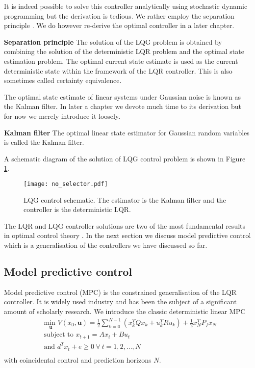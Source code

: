 It is indeed possible to solve this controller analytically using stochastic dynamic programming but the derivation is tedious. We rather employ the separation principle \cite{lqg}. We do however re-derive the optimal controller in a later chapter.
\begin{defn}
\textbf{Separation principle} The solution of the LQG problem is obtained by combining the solution of the deterministic LQR problem and the optimal state estimation problem. The optimal current state estimate is used as the current deterministic state within the framework of the LQR controller. This is also sometimes called certainty equivalence. 
\end{defn}
The optimal state estimate of linear systems under Gaussian noise is known as the Kalman filter. In later a chapter we devote much time to its derivation but for now we merely introduce it loosely.
\begin{defn}
\textbf{Kalman filter} The optimal linear state estimator for Gaussian random variables is called the Kalman filter.
\end{defn}
A schematic diagram of the solution of LQG control problem is shown  in Figure \ref{fig_mpc_no_selector}.
\begin{figure}[H] 
\centering
\texttt{[image: no\_selector.pdf]}
\caption{LQG control schematic. The estimator is the Kalman filter and the controller is the deterministic LQR.}
\label{fig_mpc_no_selector}
\end{figure}
The LQR and LQG controller solutions are two of the most fundamental results in optimal control theory \cite{robust}. In the next section we discuss model predictive control which is a generalisation of the controllers we have discussed so far.
\subsection{Model predictive control}
Model predictive control (MPC) is the constrained generalisation of the LQR controller. It is widely used industry and has been the subject of a significant amount of scholarly research. We introduce the classic deterministic linear MPC  
\begin{equation}
\begin{aligned}
&\underset{\mathbf{u}}{\text{min }} V(x_0, \mathbf{u}) = \frac{1}{2}\sum_{k=0}^{N-1} \left( x_k^TQx_k + u_k^TRu_k \right) + \frac{1}{2}x_N^TP_fx_N \\
& \text{subject to } x_{t+1} = Ax_t+Bu_t \\
& \text{and } d^Tx_t + e \geq 0 ~\forall~t=1, 2,...,N \\
\end{aligned}
\label{eq_mpc_problem}
\end{equation}
with coincidental control and prediction horizons $N$.

